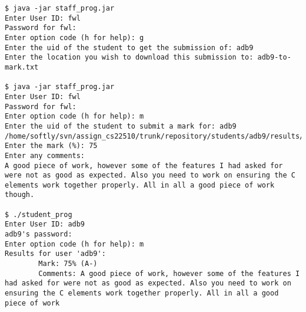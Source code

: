 \begin{verbatim}
$ java -jar staff_prog.jar
Enter User ID: fwl
Password for fwl:
Enter option code (h for help): g
Enter the uid of the student to get the submission of: adb9
Enter the location you wish to download this submission to: adb9-to-mark.txt

$ java -jar staff_prog.jar
Enter User ID: fwl
Password for fwl:
Enter option code (h for help): m
Enter the uid of the student to submit a mark for: adb9
/home/softly/svn/assign_cs22510/trunk/repository/students/adb9/results/result.txt
Enter the mark (%): 75
Enter any comments:
A good piece of work, however some of the features I had asked for were not as good as expected. Also you need to work on ensuring the C elements work together properly. All in all a good piece of work though.

$ ./student_prog
Enter User ID: adb9
adb9's password:
Enter option code (h for help): m
Results for user 'adb9':
        Mark: 75% (A-)
        Comments: A good piece of work, however some of the features I had asked for were not as good as expected. Also you need to work on ensuring the C elements work together properly. All in all a good piece of work


\end{verbatim}
